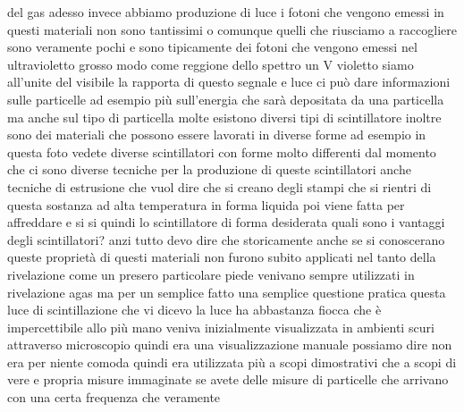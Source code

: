 {del gas adesso invece abbiamo produzione di luce i fotoni che vengono emessi in questi materiali non sono tantissimi o comunque quelli che riusciamo a raccogliere sono veramente pochi e sono tipicamente dei fotoni che vengono emessi nel ultravioletto grosso modo come reggione dello spettro un V violetto siamo all'unite del visibile la rapporta di questo segnale e luce ci può dare informazioni sulle particelle ad esempio più sull'energia che sarà depositata da una particella ma anche sul tipo di particella molte esistono diversi tipi di scintillatore inoltre sono dei materiali che possono essere lavorati in diverse forme ad esempio in questa foto vedete diverse scintillatori con forme molto differenti dal momento che ci sono diverse tecniche per la produzione di queste scintillatori anche tecniche di estrusione che vuol dire che si creano degli stampi che si rientri di questa sostanza ad alta temperatura in forma liquida poi viene fatta per affreddare e si si quindi lo scintillatore di forma desiderata quali sono i vantaggi degli scintillatori? anzi tutto devo dire che storicamente anche se si conoscerano queste proprietà di questi materiali non furono subito applicati nel tanto della rivelazione come un presero particolare piede venivano sempre utilizzati in rivelazione agas ma per un semplice fatto una semplice questione pratica questa luce di scintillazione che vi dicevo la luce ha abbastanza fiocca che è impercettibile allo più mano veniva inizialmente visualizzata in ambienti scuri attraverso microscopio quindi era una visualizzazione manuale possiamo dire non era per niente comoda quindi era utilizzata più a scopi dimostrativi che a scopi di vere e propria misure immaginate se avete delle misure di particelle che arrivano con una certa frequenza che veramente 

}
